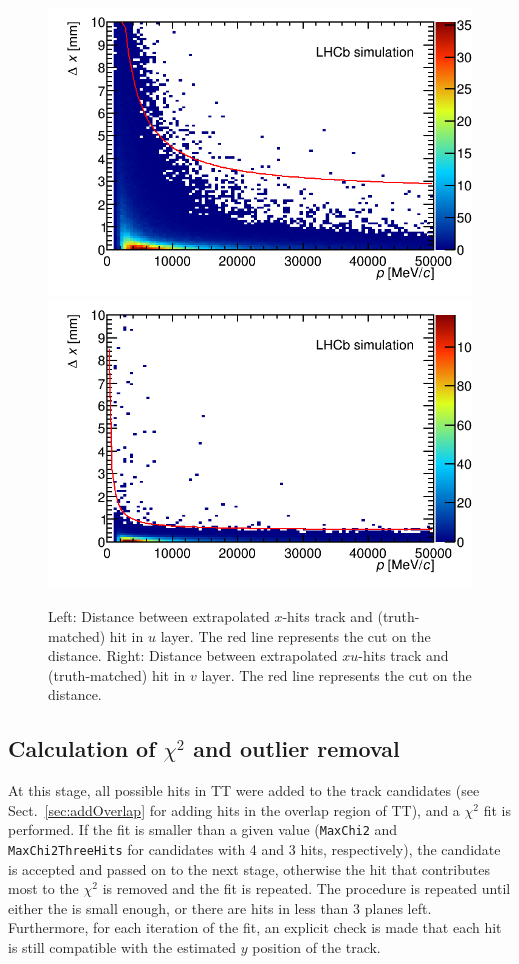 \begin{figure}[!htbp]
 \begin{center}
  \includegraphics[width=0.49\linewidth]{figures/deltaXULayerCut1.png}
  \includegraphics[width=0.49\linewidth]{figures/deltaXVLayerCut1.png}
   \caption{Left: Distance between extrapolated $x$-hits track and
   (truth-matched) hit in $u$ layer. The red line represents the cut on the
   distance. Right: Distance between extrapolated $xu$-hits track and
   (truth-matched) hit in $v$ layer. The red line represents the cut on the distance.
     \label{fig:uvLayerDist}}
 \end{center}
\end{figure}

\subsection[Calculation of $\chi^{2}$ and outlier removal]{Calculation of {\boldmath$\chi^{2}$} and outlier removal}
\label{sec:chi2}
At this stage, all possible hits in TT were added to the track candidates
(see Sect.~\ref{sec:addOverlap} for adding hits in the overlap region of TT), 
and a $\chi^{2}$ fit is performed. If the fit \chisqndf is smaller than a given value (\texttt{MaxChi2} and \texttt{MaxChi2ThreeHits} for candidates with 4 and 3 hits, respectively), 
the candidate is accepted and passed on to the next stage, otherwise the hit 
that contributes most to the $\chi^{2}$ is removed and the fit is repeated. 
The procedure is repeated until either the \chisqndf  is small enough, 
or there are hits in less than 3 planes left.
Furthermore, for each iteration of the fit, an explicit check is made
that each hit is still compatible with the estimated $y$ position of the track.

